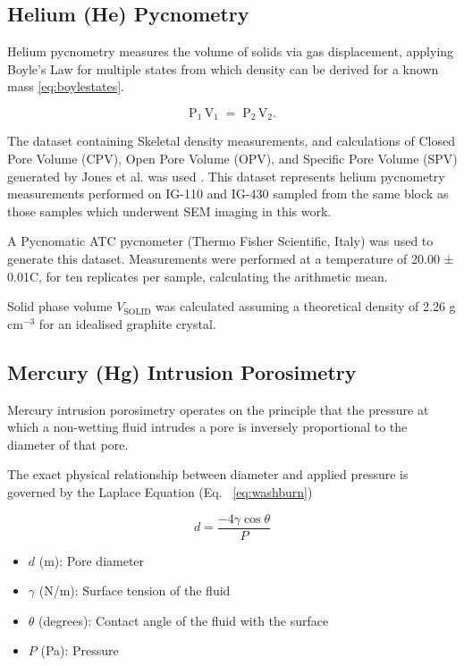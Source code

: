 \documentclass[review]{elsarticle}
\begin{document}
\subsection{Helium (He) Pycnometry}

Helium pycnometry measures the volume of solids via gas displacement, applying
Boyle's Law for multiple states  from which density can be derived for a known
mass \ref{eq:boylestates}. 

\begin{equation} \label{eq:boylestates}
  \mathrm{P}_{1}\,\mathrm{V}_{1} \;=\; \mathrm{P}_{2}\,\mathrm{V}_{2}.
\end{equation}

The dataset containing Skeletal density measurements, and calculations of Closed
Pore Volume (CPV), Open Pore Volume (OPV), and Specific Pore Volume (SPV)
generated by Jones et al. was used \citep{Jones2018}. This dataset represents
helium pycnometry measurements performed on IG-110 and IG-430 sampled from the same block as those
samples which underwent SEM imaging in this work.

A Pycnomatic ATC pycnometer (Thermo Fisher Scientific, Italy) was used to
generate this dataset. Measurements were performed at a temperature of 20.00 ±
0.01\textdegree{}C, for ten replicates per sample, calculating the arithmetic
mean. 

Solid phase volume $V_{\mathrm{SOLID}}$ was calculated assuming a theoretical
density of 2.26 g cm$^{-3}$ for an idealised graphite crystal. 

\subsection{Mercury (Hg) Intrusion Porosimetry}
Mercury intrusion porosimetry operates on the principle that the pressure at
which a non-wetting fluid intrudes a pore is inversely proportional to the
diameter of that pore.


The exact physical relationship between diameter and applied pressure is
governed by the Laplace Equation (Eq. ~\ref{eq:washburn})
	
	\begin{equation} \label{eq:washburn}
		d = \frac{-4\gamma \cos \theta}{P}
	\end{equation}

	\begin{itemize}
		\item $d$ (m): Pore diameter
		\item $\gamma$ (N/m): Surface tension of the fluid
		\item $\theta$ (degrees): Contact angle of the fluid with the surface
		\item $P$ (Pa): Pressure
	\end{itemize}
\end{document}
